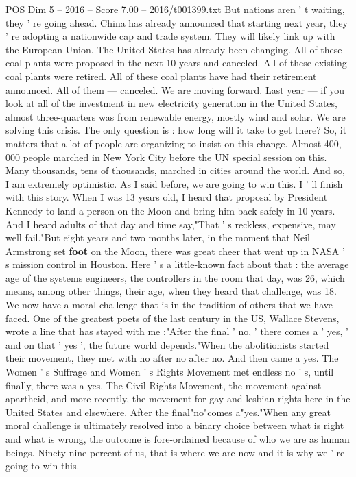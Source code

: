 \begin{textsample}{POS Dim 5 – 2016 – Score 7.00 – 2016/t001399.txt}
But nations aren ' t waiting, they ' re going ahead.
China has already announced that starting next year, they ' re adopting a nationwide cap and trade system.
They will likely link up with the European Union.
The United States has already been changing.
All of these coal plants were proposed in the next 10 years and canceled.
All of these existing coal plants were retired.
All of these coal plants have had their retirement announced.
All of them — canceled.
We are moving forward.
Last year — if you look at all of the investment in new electricity generation in the United States, almost three-quarters was from renewable energy, mostly wind and solar.
We are solving this crisis.
The only question is : how long will it take to get there?
So, it matters that a lot of people are organizing to insist on this change.
Almost 400, 000 people marched in New York City before the UN special session on this.
Many thousands, tens of thousands, marched in cities around the world.
And so, I am extremely optimistic.
As I said before, we are going to win this.
I ' ll finish with this story.
When I was 13 years old, I heard that proposal by President Kennedy to land a person on the Moon and bring him back safely in 10 years.
And I heard adults of that day and time say,"That ' s reckless, expensive, may well fail."But eight years and two months later, in the moment that Neil Armstrong set \textbf{foot} on the Moon, there was great cheer that went up in NASA ' s mission control in Houston.
Here ' s a little-known fact about that : the average age of the systems engineers, the controllers in the room that day, was 26, which means, among other things, their age, when they heard that challenge, was 18.
We now have a moral challenge that is in the tradition of others that we have faced.
One of the greatest poets of the last century in the US, Wallace Stevens, wrote a line that has stayed with me :"After the final ' no, ' there comes a ' yes, ' and on that ' yes ', the future world depends."When the abolitionists started their movement, they met with no after no after no.
And then came a yes.
The Women ' s Suffrage and Women ' s Rights Movement met endless no ' s, until finally, there was a yes.
The Civil Rights Movement, the movement against apartheid, and more recently, the movement for gay and lesbian rights here in the United States and elsewhere.
After the final"no"comes a"yes."When any great moral challenge is ultimately resolved into a binary choice between what is right and what is wrong, the outcome is fore-ordained because of who we are as human beings.
Ninety-nine percent of us, that is where we are now and it is why we ' re going to win this.

\end{textsample}
